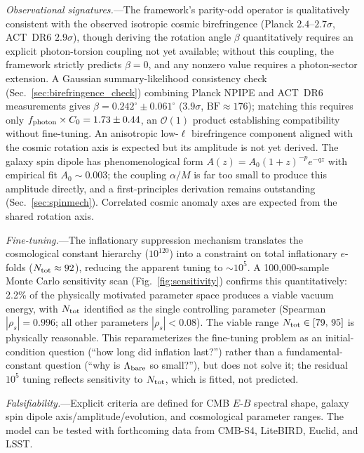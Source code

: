\documentclass[aps,prd,twocolumn,superscriptaddress,showpacs,preprintnumbers,nofootinbib,longbibliography,floatfix]{revtex4-2}
\begin{document}
\textit{Observational signatures.}---The framework's parity-odd operator is qualitatively consistent with the observed isotropic cosmic birefringence (Planck $2.4$--$2.7\sigma$, ACT~DR6 $2.9\sigma$), though deriving the rotation angle $\beta$ quantitatively requires an explicit photon-torsion coupling not yet available; without this coupling, the framework strictly predicts $\beta = 0$, and any nonzero value requires a photon-sector extension. A Gaussian summary-likelihood consistency check (Sec.~\ref{sec:birefringence_check}) combining Planck NPIPE and ACT~DR6 measurements gives $\beta = 0.242^\circ \pm 0.061^\circ$ ($3.9\sigma$, $\mathrm{BF} \approx 176$); matching this requires only $f_{\rm photon} \times C_0 = 1.73 \pm 0.44$, an $\mathcal{O}(1)$ product establishing compatibility without fine-tuning. An anisotropic low-$\ell$ birefringence component aligned with the cosmic rotation axis is expected but its amplitude is not yet derived. The galaxy spin dipole has phenomenological form $A(z)=A_0(1+z)^{-p}e^{-qz}$ with empirical fit $A_0 \sim 0.003$; the coupling $\alpha/M$ is far too small to produce this amplitude directly, and a first-principles derivation remains outstanding (Sec.~\ref{sec:spinmech}). Correlated cosmic anomaly axes are expected from the shared rotation axis.

\textit{Fine-tuning.}---The inflationary suppression mechanism translates the cosmological constant hierarchy ($10^{120}$) into a constraint on total inflationary $e$-folds ($N_{\rm tot}\approx 92$), reducing the apparent tuning to $\sim 10^5$. A 100{,}000-sample Monte Carlo sensitivity scan (Fig.~\ref{fig:sensitivity}) confirms this quantitatively: 2.2\% of the physically motivated parameter space produces a viable vacuum energy, with $N_{\rm tot}$ identified as the single controlling parameter (Spearman $|\rho_s| = 0.996$; all other parameters $|\rho_s| < 0.08$). The viable range $N_{\rm tot} \in [79,\,95]$ is physically reasonable. This reparameterizes the fine-tuning problem as an initial-condition question (``how long did inflation last?'') rather than a fundamental-constant question (``why is $\Lambda_{\rm bare}$ so small?''), but does not solve it; the residual $10^5$ tuning reflects sensitivity to $N_{\rm tot}$, which is fitted, not predicted.

\textit{Falsifiability.}---Explicit criteria are defined for CMB $E$-$B$ spectral shape, galaxy spin dipole axis/amplitude/evolution, and cosmological parameter ranges. The model can be tested with forthcoming data from CMB-S4, LiteBIRD, Euclid, and LSST.
\end{document}
